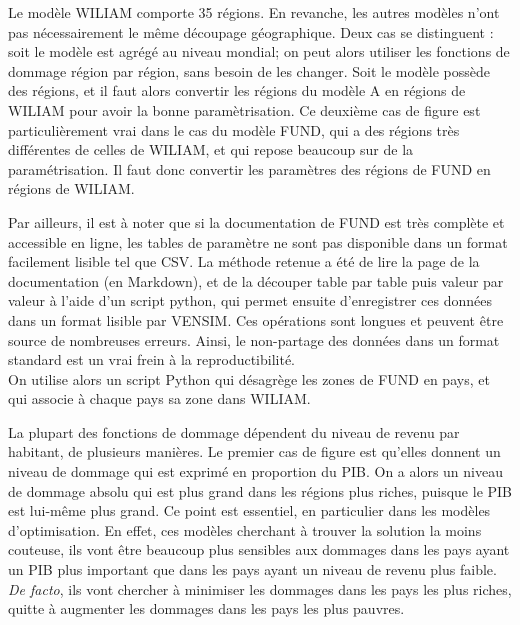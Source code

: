 \begin{methodbox}

    Le modèle WILIAM comporte 35 régions. En revanche, les autres modèles n'ont pas nécessairement le même découpage géographique. Deux cas se distinguent : soit le modèle est agrégé au niveau mondial; on peut alors utiliser les fonctions de dommage région par région, sans besoin de les changer. Soit le modèle possède des régions, et il faut alors convertir les régions du modèle A en régions de WILIAM pour avoir la bonne paramètrisation. Ce deuxième cas de figure est particulièrement vrai dans le cas du modèle FUND, qui a des régions très différentes de celles de WILIAM, et qui repose beaucoup sur de la paramétrisation. Il faut donc convertir les paramètres des régions de FUND en régions de WILIAM. 

    Par ailleurs, il est à noter que si la documentation de FUND est très complète et accessible en ligne, les tables de paramètre ne sont pas disponible dans un format facilement lisible tel que CSV. La méthode retenue a été de lire la page de la documentation (en Markdown), et de la découper table par table puis valeur par valeur à l'aide d'un script python, qui permet ensuite d'enregistrer ces données dans un format lisible par VENSIM. Ces opérations sont longues et peuvent être source de nombreuses erreurs. Ainsi, le non-partage des données dans un format standard est un vrai frein à la reproductibilité. \\
    
    On utilise alors un script Python qui désagrège les zones de FUND en pays, et qui associe à chaque pays sa zone dans WILIAM. 
    
\end{methodbox}

La plupart des fonctions de dommage dépendent du niveau de revenu par habitant, de plusieurs manières. Le premier cas de figure est qu'elles donnent un niveau de dommage qui est exprimé en proportion du PIB. On a alors un niveau de dommage absolu qui est plus grand dans les régions plus riches, puisque le PIB est lui-même plus grand. Ce point est essentiel, en particulier dans les modèles d'optimisation. En effet, ces modèles cherchant à trouver la solution la moins couteuse, ils vont être beaucoup plus sensibles aux dommages dans les pays ayant un PIB plus important que dans les pays ayant un niveau de revenu plus faible. \emph{De facto}, ils vont chercher à minimiser les dommages dans les pays les plus riches, quitte à augmenter les dommages dans les pays les plus pauvres. \\

